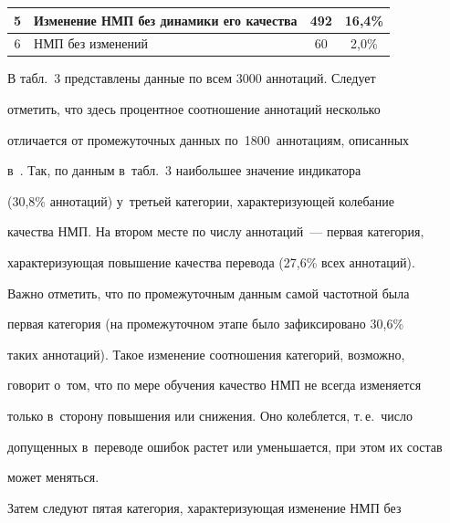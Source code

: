 \begin{table}
\begin{center}
\begin{tabular}{|c|l|c|c|}
\hline


5&Изменение НМП без динамики его качества&492&16,4\%\\


\hline


6&НМП без изменений&\hphantom{9}60&\hphantom{9}2,0\%\\


\hline


\end{tabular}


\end{center}


\vspace*{-6pt}


\end{table}


   


   В табл.~3 представлены данные по всем 3000 аннотаций. Следует 


отметить, что здесь процентное соотношение аннотаций несколько 


отличается от промежуточных данных по~1800~аннотациям, описанных 


в~\cite{17-ez}. Так, по данным в~табл.~3 наибольшее значение индикатора 


(30,8\% аннотаций) у~третьей категории, ха\-рак\-те\-ри\-зу\-ющей колебание 


качества НМП. На втором месте по числу аннотаций~--- первая категория, 


характеризующая повышение качества перевода (27,6\% всех аннотаций). 


Важно отметить, что по промежуточным данным самой час\-тот\-ной была 


первая категория (на промежуточном этапе было зафиксировано 30,6\% 


таких аннотаций). Такое изменение соотношения категорий, возможно, 


говорит о~том, что по мере обучения качество НМП не всегда изменяется 


только в~сторону повышения или снижения. Оно колеблется, т.\,е.\ число 


допущенных в~переводе ошибок рас\-тет или уменьшается, при этом их со\-став 


может меняться.


   


   Затем следуют пятая категория, характеризующая изменение НМП без 


